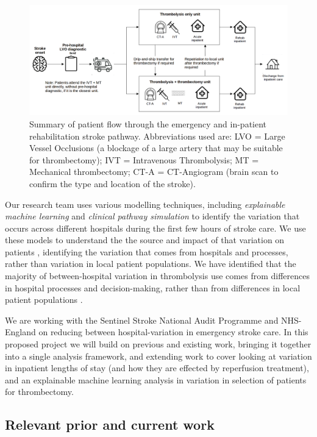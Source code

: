 \begin{figure}[h!]
\centering
\includegraphics[width=1.0\textwidth]{./images/pathway}
\caption{Summary of patient flow through the emergency and in-patient rehabilitation stroke pathway. Abbreviations used are: LVO = Large Vessel Occlusions (a blockage of a large artery that may be suitable for thrombectomy); IVT = Intravenous Thrombolysis; MT = Mechanical thrombectomy; CT-A = CT-Angiogram (brain scan to confirm the type and location of the stroke).}
\label{fig:flow}
\end{figure}

Our research team uses various modelling techniques, including \textit{explainable machine learning} and \textit{clinical pathway simulation} to identify the variation that occurs across different hospitals during the first few hours of stroke care. We use these models to understand the the source and impact of that variation on patients \cite{allen_using_2022, allen_use_2022}, identifying the variation that comes from hospitals and processes, rather than variation in local patient populations. We have identified that the majority of between-hospital variation in thrombolysis use comes from differences in hospital processes and decision-making, rather than from differences in local patient populations \cite{allen_using_2022, allen_use_2022}.

We are working with the Sentinel Stroke National Audit Programme and NHS-England on reducing between hospital-variation in emergency stroke care. In this proposed project we will build on previous and existing work, bringing it together into a single analysis framework, and extending work to cover looking at variation in inpatient lengths of stay (and how they are effected by reperfusion treatment), and an explainable machine learning analysis in variation in selection of patients for thrombectomy.

\subsection*{Relevant prior and current work}

